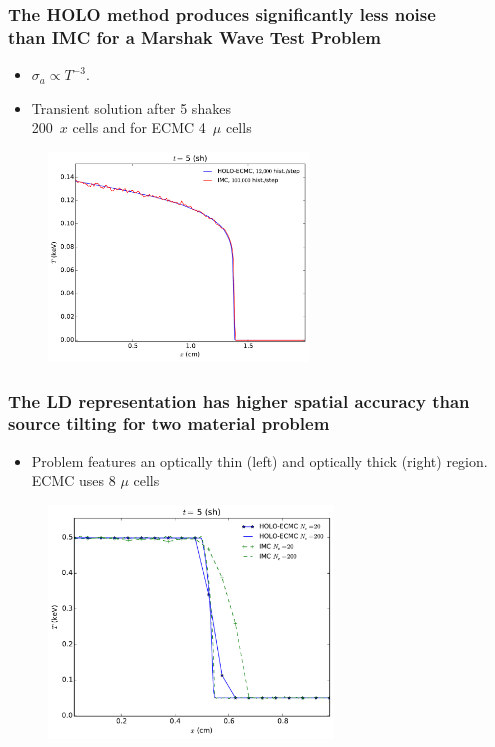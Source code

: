 \documentclass[xcolor=dvipsnames,hyperref={pdfpagelabels=false},unknownkeysallowed]{beamer}
\newcommand{\colb}[1]{{\color{blue} #1}}
\newcommand{\colG}[1]{{\color{Gray!110} #1}}
\newlength{\wideitemsep}
\let\olditem\item
\renewcommand{\item}{\setlength{\itemsep}{\wideitemsep}\olditem}
\begin{document}
\begin{frame}
    \frametitle{The HOLO method produces significantly less noise \\ than IMC for a Marshak Wave Test Problem}
    \centering
        \begin{itemize}
            \item \colb{$\sigma_a\propto T^{-3}$}. 
            \item Transient solution after 5 shakes \\ \colG{200~$x$ cells and for ECMC 4~$\mu$  cells }
        \end{itemize}
    \begin{figure}
    \includegraphics[width=0.615799\textwidth]{marshak_200_compare.pdf}
    \end{figure}
\end{frame}

\begin{frame}
    \frametitle{The LD representation has higher spatial accuracy than source tilting for
    two material problem}
        \begin{itemize}
            \item[] Problem features an optically thin (left) and
                optically thick (right) region. \colG{ECMC uses 8 $\mu$ cells}
        \end{itemize}
\begin{figure}
    \centering
    \includegraphics[width=0.6755799\textwidth]{two_mat_conv.pdf}
\end{figure}

\end{frame}
\end{document}

